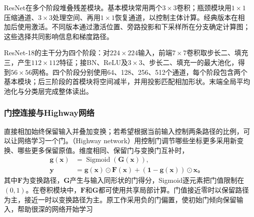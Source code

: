 ResNet在多个阶段堆叠残差模块。基本模块常用两个$3\times3$卷积；瓶颈模块用$1\times1$压缩通道、$3\times3$处理空间、再用$1\times1$恢复通道，以控制主体计算。经典版本在相加后使用激活。不同版本通过激活位置、旁路投影和下采样所在分支确定计算图；这些选择共同影响信息和梯度路径。

ResNet-18的主干分为四个阶段：对$224\times224$输入，前端$7\times7$卷积取步长二、填充三，产生$112\times112$特征；接BN、ReLU及$3\times3$、步长二、填充一的最大池化，得到$56\times56$网格。四个阶段分别使用64、128、256、512个通道，每个阶段包含两个基本模块；后三阶段的首模块将空间减半，并用投影匹配相加形状。末端全局平均池化与分类层完成整体读出。

\subsubsection{门控连接与Highway网络}
\label{sec:cnn-highway}

直接相加始终保留输入并叠加变换；若希望根据当前输入控制两条路径的比例，可以让网络学习一个门。（Highway network）用控制门调节哪些坐标更多采用新变换、哪些更多保留原值。维度相同、保留门与变换门互补时，
\begin{equation}
  \begin{aligned}
    \bm g(\bm x)&=\operatorname{Sigmoid}(\bm G(\bm x)),\\
    \bm y&=\bm g(\bm x)\odot\bm F(\bm x)
            +(\bm1-\bm g(\bm x))\odot\bm x\text{。}
  \end{aligned}
  \label{eq:cnn-highway-block}
\end{equation}
其中$\bm F$为变换路径，$\bm G$产生与输入同形状的门得分，Sigmoid逐元素把门值限制在$(0,1)$。在卷积模块中，$\bm F$和$\bm G$都可使用共享局部计算。门值接近零时以保留路径为主，接近一时以变换路径为主。原工作采用负的门偏置，使初始门倾向保留输入，帮助很深的网络开始学习

